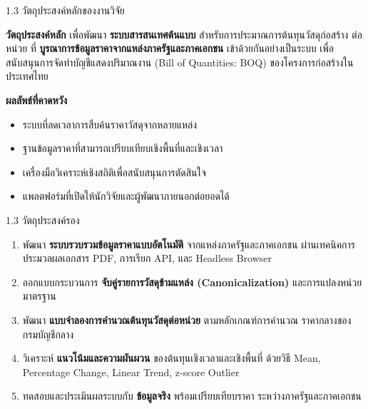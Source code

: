 \documentclass[aspectratio=169,11pt]{beamer}
\begin{document}
\begin{frame}{1.3 วัตถุประสงค์หลักของงานวิจัย}
  \begin{block}{\textbf{วัตถุประสงค์หลัก}}
    เพื่อพัฒนา \textbf{ระบบสารสนเทศต้นแบบ} สำหรับการประมาณการต้นทุนวัสดุก่อสร้าง
    ต่อหน่วย ที่ \textbf{บูรณาการข้อมูลราคาจากแหล่งภาครัฐและภาคเอกชน}
    เข้าด้วยกันอย่างเป็นระบบ เพื่อสนับสนุนการจัดทำบัญชีแสดงปริมาณงาน
    (Bill of Quantities: BOQ) ของโครงการก่อสร้างในประเทศไทย
  \end{block}
  \vspace{0.5em}
  \textbf{ผลลัพธ์ที่คาดหวัง}
  \begin{itemize}
    \item ระบบที่ลดเวลาการสืบค้นราคาวัสดุจากหลายแหล่ง
    \item ฐานข้อมูลราคาที่สามารถเปรียบเทียบเชิงพื้นที่และเชิงเวลา
    \item เครื่องมือวิเคราะห์เชิงสถิติเพื่อสนับสนุนการตัดสินใจ
    \item แพลตฟอร์มที่เปิดให้นักวิจัยและผู้พัฒนาภายนอกต่อยอดได้
  \end{itemize}
\end{frame}

\begin{frame}{1.3 วัตถุประสงค์รอง}
  \begin{enumerate}
    \item พัฒนา \textbf{ระบบรวบรวมข้อมูลราคาแบบอัตโนมัติ} จากแหล่งภาครัฐและภาคเอกชน
          ผ่านเทคนิคการประมวลผลเอกสาร PDF, การเรียก API, และ Headless Browser
    \item ออกแบบกระบวนการ \textbf{จับคู่รายการวัสดุข้ามแหล่ง (Canonicalization)}
          และการแปลงหน่วยมาตรฐาน
    \item พัฒนา \textbf{แบบจำลองการคำนวณต้นทุนวัสดุต่อหน่วย} ตามหลักเกณฑ์การคำนวณ
          ราคากลางของกรมบัญชีกลาง
    \item วิเคราะห์ \textbf{แนวโน้มและความผันผวน} ของต้นทุนเชิงเวลาและเชิงพื้นที่
          ด้วยวิธี Mean, Percentage Change, Linear Trend, z-score Outlier
    \item ทดสอบและประเมินผลระบบกับ \textbf{ข้อมูลจริง} พร้อมเปรียบเทียบราคา
          ระหว่างภาครัฐและภาคเอกชน
  \end{enumerate}
\end{frame}
\end{document}
